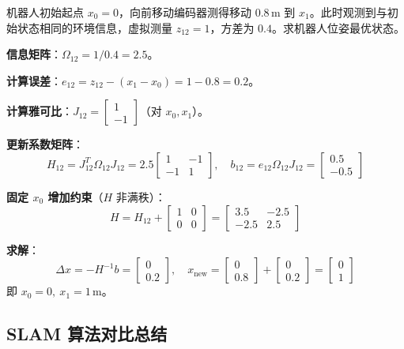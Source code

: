 \documentclass[11pt,a4paper]{article}
\begin{document}
\begin{example}
机器人初始起点 $x_0=0$，向前移动编码器测得移动 $0.8\,\mathrm{m}$ 到 $x_1$。此时观测到与初始状态相同的环境信息，虚拟测量 $z_{12}=1$，方差为 $0.4$。求机器人位姿最优状态。

\textbf{信息矩阵}：$\Omega_{12}=1/0.4=2.5$。

\textbf{计算误差}：$e_{12}=z_{12}-(x_1-x_0)=1-0.8=0.2$。

\textbf{计算雅可比}：$J_{12}=\begin{bmatrix}1\\ -1\end{bmatrix}$（对 $x_0,x_1$）。

\textbf{更新系数矩阵}：
\[
H_{12}=J_{12}^T\Omega_{12}J_{12}=2.5\begin{bmatrix}1 & -1\\ -1 & 1\end{bmatrix},\quad
b_{12}=e_{12}\Omega_{12}J_{12}=\begin{bmatrix}0.5\\ -0.5\end{bmatrix}
\]

\textbf{固定 $x_0$ 增加约束}（$H$ 非满秩）：
\[
H=H_{12}+\begin{bmatrix}1 & 0\\ 0 & 0\end{bmatrix}=\begin{bmatrix}3.5 & -2.5\\ -2.5 & 2.5\end{bmatrix}
\]

\textbf{求解}：
\[
\Delta x=-H^{-1}b=\begin{bmatrix}0\\ 0.2\end{bmatrix},\quad
x_{\text{new}}=\begin{bmatrix}0\\ 0.8\end{bmatrix}+\begin{bmatrix}0\\ 0.2\end{bmatrix}=\begin{bmatrix}0\\ 1\end{bmatrix}
\]
即 $x_0=0,\ x_1=1\,\mathrm{m}$。
\end{example}

\subsection*{SLAM 算法对比总结}
\end{document}
